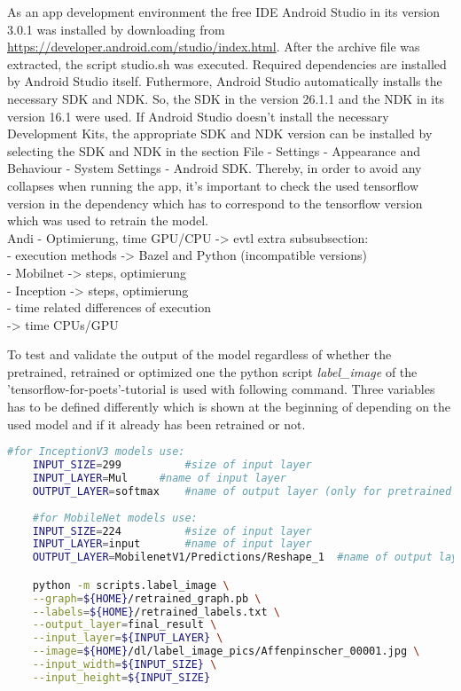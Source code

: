 As an app development environment the free IDE Android Studio in its version 3.0.1 was installed by downloading from \url{https://developer.android.com/studio/index.html}. After the archive file was extracted, the script studio.sh was executed. Required dependencies are installed by Android Studio itself. Futhermore, Android Studio automatically installs the necessary SDK and NDK. So, the SDK in the version 26.1.1 and the NDK in its version 16.1 were used. If Android Studio doesn't install the necessary Development Kits, the appropriate SDK and NDK version can be installed by selecting the SDK and NDK in the section File - Settings - Appearance and Behaviour - System Settings - Android SDK. Thereby, in order to avoid any collapses when running the app, it's important to check the used tensorflow version in the dependency which has to correspond to the tensorflow version which was used to retrain the model.\\

	 Andi 
	-  Optimierung, time GPU/CPU
	-> evtl extra subsubsection: \\
		- execution methods -> Bazel and Python (incompatible versions) \\
		- Mobilnet -> steps, optimierung \\
		- Inception -> steps, optimierung \\
		- time related differences of execution  \\
		  -> time CPUs/GPU

To test and validate the output of the model regardless of whether the pretrained, retrained or optimized one the python script \textit{label\_image} of the 'tensorflow-for-poets'-tutorial is used with following command. Three variables has to be defined differently which is shown at the beginning of  depending on the used model and if it already has been retrained or not.
\begin{lstlisting}[caption=Call of \textit{label\_image.py}, label=list:label_image, language=bash]
	#for InceptionV3 models	use:
	INPUT_SIZE=299			#size of input layer
	INPUT_LAYER=Mul		#name of input layer
	OUTPUT_LAYER=softmax	#name of output layer (only for pretrained model otherwise 'final_result' or as defined in retrain-script)
	
	#for MobileNet models use:
	INPUT_SIZE=224			#size of input layer
	INPUT_LAYER=input	 	#name of input layer
	OUTPUT_LAYER=MobilenetV1/Predictions/Reshape_1	#name of output layer (only for pretrained model otherwise 'final_result' or as defined in retrain-script)

	python -m scripts.label_image \
	--graph=${HOME}/retrained_graph.pb \
	--labels=${HOME}/retrained_labels.txt \
	--output_layer=final_result \
	--input_layer=${INPUT_LAYER} \
	--image=${HOME}/dl/label_image_pics/Affenpinscher_00001.jpg \
	--input_width=${INPUT_SIZE} \
	--input_height=${INPUT_SIZE}
\end{lstlisting}

